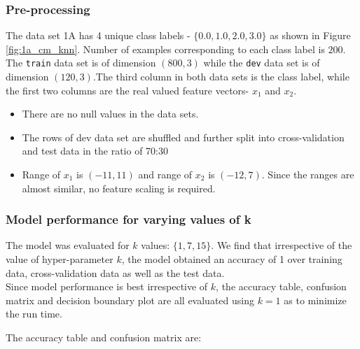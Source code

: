 \documentclass[11pt,a4paper]{article}
\newcommand{\noi}{\noindent}
\def\tt#1{\texttt{#1}}
\begin{document}
\subsubsection{Pre-processing}

The data set 1A has 4 unique class labels - $\{0.0, 1.0, 2.0, 3.0\}$ as shown in Figure \ref{fig:1a_cm_knn}. Number of examples corresponding to each class label is $200$.
The \tt{train} data set is of dimension $(800,3)$ while the \tt{dev} data set is of dimension $(120,3)$.The third column in both data sets is the class label, while the first two columns are the real valued feature vectors- $x_{1}$ and $x_{2}$.
\begin{itemize}
    \itemsep0em
    \item There are no null values in the data sets. 
    \item The rows of dev data set are shuffled and further split into cross-validation and test data in the ratio of 70:30
    \item Range of $x_1$ is $(-11,11)$ and range of $x_2$ is $(-12,7)$. Since the ranges are almost similar, no feature scaling is required.  
\end{itemize}

\subsubsection{Model performance for varying values of k}
The model was evaluated for $k$ values: $\{1,7,15\}$. We find that irrespective of the value of hyper-parameter $k$, the model obtained an accuracy of 1 over training data, cross-validation data as well as the test data. \\

\noi
Since model performance is best irrespective of $k$, the accuracy table, confusion matrix and decision boundary plot are all evaluated using $k=1$ as to minimize the run time.

\noi
The accuracy table and confusion matrix are: 

\end{document}
